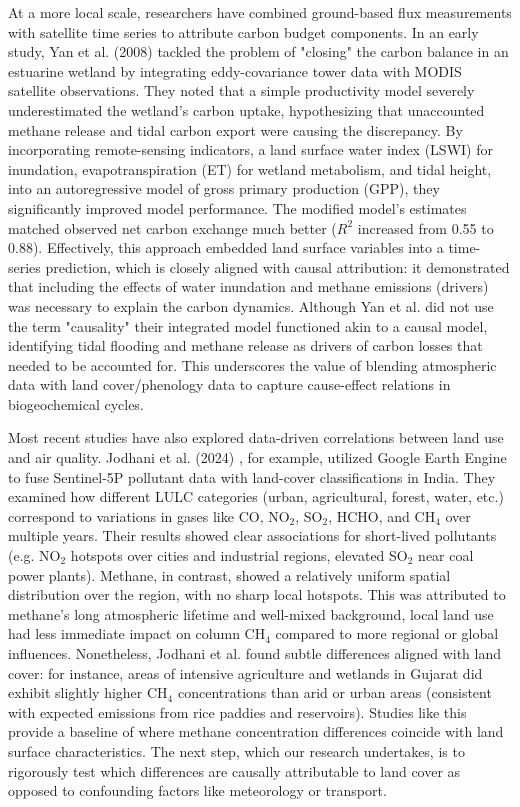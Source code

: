 At a more local scale, researchers have combined ground-based flux measurements with satellite time series to attribute carbon budget components. In an early study, Yan et al. (2008) \cite{Yan2008} tackled the problem of "closing" the carbon balance in an estuarine wetland by integrating eddy-covariance tower data with MODIS satellite observations. They noted that a simple productivity model severely underestimated the wetland's carbon uptake, hypothesizing that unaccounted methane release and tidal carbon export were causing the discrepancy. By incorporating remote-sensing indicators, a land surface water index (LSWI) for inundation, evapotranspiration (ET) for wetland metabolism, and tidal height, into an autoregressive model of gross primary production (GPP), they significantly improved model performance. The modified model's estimates matched observed net carbon exchange much better ($R^2$ increased from 0.55 to 0.88). Effectively, this approach embedded land surface variables into a time-series prediction, which is closely aligned with causal attribution: it demonstrated that including the effects of water inundation and methane emissions (drivers) was necessary to explain the carbon dynamics. Although Yan et al. did not use the term "causality" their integrated model functioned akin to a causal model, identifying tidal flooding and methane release as drivers of carbon losses that needed to be accounted for. This underscores the value of blending atmospheric data with land cover/phenology data to capture cause-effect relations in biogeochemical cycles.

Most recent studies have also explored data-driven correlations between land use and air quality. Jodhani et al. (2024) \cite{Jodhani2024}, for example, utilized Google Earth Engine to fuse Sentinel-5P pollutant data with land-cover classifications in India. They examined how different LULC categories (urban, agricultural, forest, water, etc.) correspond to variations in gases like CO, NO$_2$, SO$_2$, HCHO, and CH$_4$ over multiple years. Their results showed clear associations for short-lived pollutants (e.g. NO$_2$ hotspots over cities and industrial regions, elevated SO$_2$ near coal power plants). Methane, in contrast, showed a relatively uniform spatial distribution over the region, with no sharp local hotspots. This was attributed to methane's long atmospheric lifetime and well-mixed background, local land use had less immediate impact on column CH$_4$ compared to more regional or global influences. Nonetheless, Jodhani et al. found subtle differences aligned with land cover: for instance, areas of intensive agriculture and wetlands in Gujarat did exhibit slightly higher CH$_4$ concentrations than arid or urban areas (consistent with expected emissions from rice paddies and reservoirs). Studies like this provide a baseline of where methane concentration differences coincide with land surface characteristics. The next step, which our research undertakes, is to rigorously test which differences are causally attributable to land cover as opposed to confounding factors like meteorology or transport.

